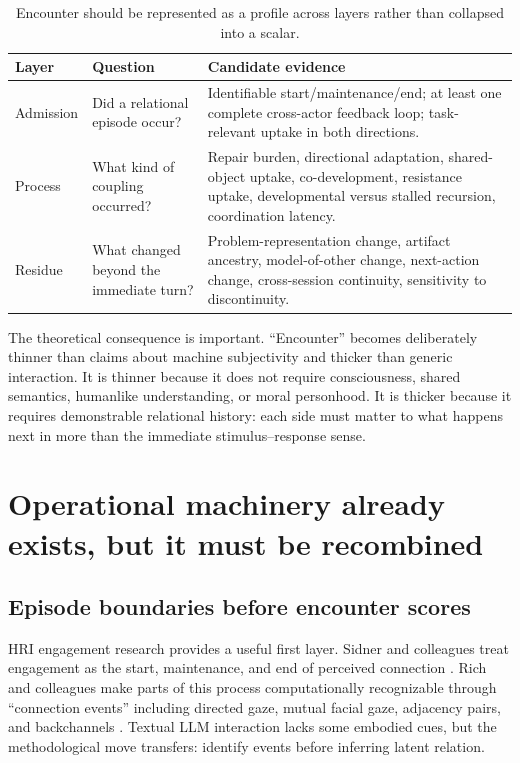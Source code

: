 \documentclass[11pt]{article}
\begin{document}
\begin{table}[ht]
\centering
\small
\begin{tabularx}{\textwidth}{@{}p{}p{}X@{}}
\toprule
\textbf{Layer} & \textbf{Question} & \textbf{Candidate evidence} \\
\midrule
Admission & Did a relational episode occur? & Identifiable start/maintenance/end; at least one complete cross-actor feedback loop; task-relevant uptake in both directions. \\
Process & What kind of coupling occurred? & Repair burden, directional adaptation, shared-object uptake, co-development, resistance uptake, developmental versus stalled recursion, coordination latency. \\
Residue & What changed beyond the immediate turn? & Problem-representation change, artifact ancestry, model-of-other change, next-action change, cross-session continuity, sensitivity to discontinuity. \\
\bottomrule
\end{tabularx}
\caption{Encounter should be represented as a profile across layers rather than collapsed into a scalar.}
\end{table}

The theoretical consequence is important. ``Encounter'' becomes deliberately thinner than claims about machine subjectivity and thicker than generic interaction. It is thinner because it does not require consciousness, shared semantics, humanlike understanding, or moral personhood. It is thicker because it requires demonstrable relational history: each side must matter to what happens next in more than the immediate stimulus--response sense.

\section{Operational machinery already exists, but it must be recombined}

\subsection{Episode boundaries before encounter scores}

HRI engagement research provides a useful first layer. Sidner and colleagues treat engagement as the start, maintenance, and end of perceived connection \citep{SidnerEtAl2005Engagement}. Rich and colleagues make parts of this process computationally recognizable through ``connection events'' including directed gaze, mutual facial gaze, adjacency pairs, and backchannels \citep{RichEtAl2010Engagement}. Textual LLM interaction lacks some embodied cues, but the methodological move transfers: identify events before inferring latent relation.
\end{document}
